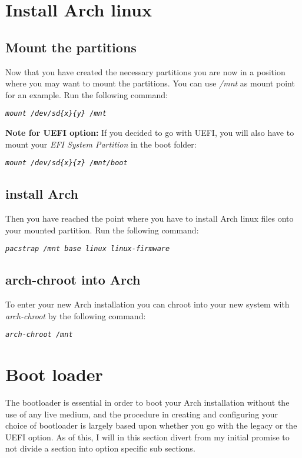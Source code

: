 \documentclass{article}
\newcommand{\code}[1]{\begin{center}
		\textit{\texttt{#1}}
\end{center}}
\begin{document}
  \section{Install Arch linux}
  
  \subsection*{Mount the partitions}
  
  Now that you have created the necessary partitions you are now in a position where you may want to mount the partitions.  You can use \textit{/mnt} as mount point for an example. Run the following command:
  
  \code{mount /dev/sd\{x\}\{y\} /mnt}
  
  \textbf{Note for UEFI option:} If you decided to go with UEFI, you will also have to mount your \textit{EFI System Partition} in the boot folder:
  
  \code{mount /dev/sd\{x\}\{z\} /mnt/boot}  
  
  \subsection*{install Arch}
  
  Then you have reached the point where you have to install Arch linux files onto your mounted partition. Run the following command:
  
  \code{pacstrap /mnt base linux linux-firmware}
  
  \subsection*{arch-chroot into Arch}
  
  To enter your new Arch installation you can chroot into your new system with \textit{arch-chroot} by the following command:
  
  \code{arch-chroot /mnt}
  
  \section{Boot loader}
  
  The bootloader is essential  in order to boot your Arch installation without the use of any live medium, and the procedure in creating and configuring your choice of bootloader  is largely based upon whether you go with the legacy or the UEFI option. As of this, I will in this section divert from my initial promise to not divide a section into option specific sub sections.  
\end{document}
